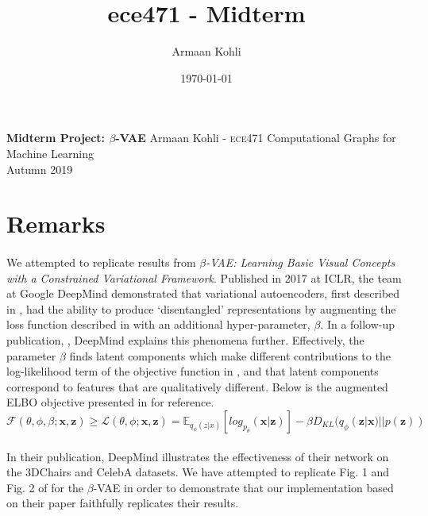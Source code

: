 \documentclass[justified,nobib]{tufte-handout}
\title{ece471 - Midterm}
\author{Armaan Kohli}
\date{\today}
\begin{document}
\begin{fullwidth}
{
  \noindent\fontsize{12pt}{20pt}\selectfont\textbf{Midterm Project: $\beta$-VAE}
  \newline
  \fontsize{12pt}{18pt}\selectfont
  {Armaan Kohli - \scshape ece}471 Computational Graphs for Machine Learning \\Autumn 2019\\
}
\raggedright
\raggedbottom
\section{Remarks}
\paragraph{} We attempted to replicate results from \textit{$\beta$-VAE: Learning Basic Visual Concepts with a Constrained Variational Framework}\cite{bvae}. Published in 2017 at ICLR, the team at Google DeepMind demonstrated that variational autoencoders, first described in \cite{vae}, had the ability to produce `disentangled' representations by augmenting the loss function described in \citep{vae} with an additional hyper-parameter, $\beta$. In a follow-up publication, \cite{bvae-dis}, DeepMind explains this phenomena further. Effectively, the parameter $\beta$ finds latent components which make different contributions to the log-likelihood term of the objective function in \citep{vae}, and that latent components correspond to features that are qualitatively different. Below is the augmented ELBO objective presented in \citep{bvae} for reference.
\begin{equation}
\mathcal{F}(\theta,\phi,\beta;\bm{x},\bm{z}) \geq \mathcal{L}(\theta,\phi;\bm{x},\bm{z}) = \mathbb{E}_{q_{\phi}(z|x)}[log_{p_{\theta}}(\bm{x}|\bm{z})]-\beta D_{KL}(q_{\phi}(\bm{z}|\bm{x})||p(\bm{z}))
\end{equation}


\paragraph{} In their publication, DeepMind illustrates the effectiveness of their network on the 3DChairs and CelebA datasets. We have attempted to replicate Fig. 1 and Fig. 2 of \citep{bvae} for the $\beta$-VAE in order to demonstrate that our implementation based on their paper faithfully replicates their results. 


\end{fullwidth}
\end{document}
